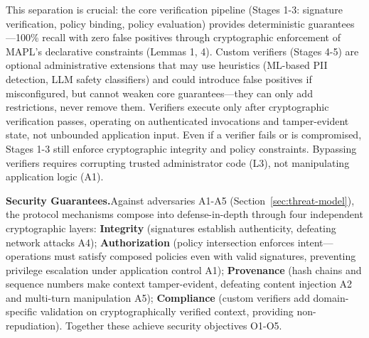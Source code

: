 This separation is crucial: the core verification pipeline (Stages 1-3: signature verification, policy binding, policy evaluation) provides deterministic guarantees—100\% recall with zero false positives through cryptographic enforcement of MAPL's declarative constraints (Lemmas 1, 4). Custom verifiers (Stages 4-5) are optional administrative extensions that may use heuristics (ML-based PII detection, LLM safety classifiers) and could introduce false positives if misconfigured, but cannot weaken core guarantees—they can only add restrictions, never remove them. Verifiers execute only after cryptographic verification passes, operating on authenticated invocations and tamper-evident state, not unbounded application input. Even if a verifier fails or is compromised, Stages 1-3 still enforce cryptographic integrity and policy constraints. Bypassing verifiers requires corrupting trusted administrator code (L3), not manipulating application logic (A1).


\noindent\textbf{Security Guarantees.}Against adversaries A1-A5 (Section~\ref{sec:threat-model}), the protocol mechanisms compose into defense-in-depth through four independent cryptographic layers: \textbf{Integrity} (signatures establish authenticity, defeating network attacks A4); \textbf{Authorization} (policy intersection enforces intent—operations must satisfy composed policies even with valid signatures, preventing privilege escalation under application control A1); \textbf{Provenance} (hash chains and sequence numbers make context tamper-evident, defeating content injection A2 and multi-turn manipulation A5); \textbf{Compliance} (custom verifiers add domain-specific validation on cryptographically verified context, providing non-repudiation). Together these achieve security objectives O1-O5.


